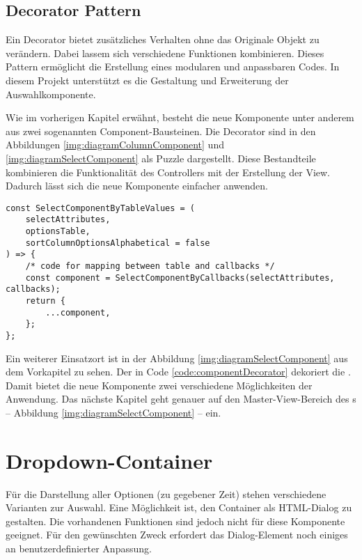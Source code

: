 \subsection{Decorator Pattern}
\label{sec:decoratorPattern}

Ein Decorator bietet zusätzliches Verhalten ohne das Originale Objekt zu verändern. 
Dabei lassem sich verschiedene Funktionen kombinieren. 
Dieses Pattern ermöglicht die Erstellung eines modularen und anpassbaren Codes. 
In diesem Projekt unterstützt es die Gestaltung und Erweiterung der Auswahlkomponente. 

Wie im vorherigen Kapitel erwähnt, besteht die neue Komponente unter anderem aus zwei sogenannten Component-Bausteinen. 
Die Decorator sind in den Abbildungen \ref{img:diagramColumnComponent} und \ref{img:diagramSelectComponent} als Puzzle dargestellt. 
Diese Bestandteile kombinieren die Funktionalität des Controllers mit der Erstellung der View. 
Dadurch lässt sich die neue Komponente einfacher anwenden. 

\begin{lstlisting}[style = htmlcssjs, caption = \codestyle{SelectComponentByTableValues} dekoriert \codestyle{SelectComponentByCallbacks}, label = code:componentDecorator]
const SelectComponentByTableValues = (
    selectAttributes,
    optionsTable,
    sortColumnOptionsAlphabetical = false
) => {
    /* code for mapping between table and callbacks */
    const component = SelectComponentByCallbacks(selectAttributes, callbacks);
    return {
        ...component,
    };
};
\end{lstlisting}

Ein weiterer Einsatzort ist in der Abbildung \ref{img:diagramSelectComponent} aus dem Vorkapitel zu sehen. 
Der  in Code \ref{code:componentDecorator} dekoriert die . 
Damit bietet die neue Komponente zwei verschiedene Möglichkeiten der Anwendung. 
Das nächste Kapitel geht genauer auf den Master-View-Bereich des s – Abbildung \ref{img:diagramSelectComponent} – ein. 


\section{Dropdown-Container}
\label{sec:dropdownContainer}

Für die Darstellung aller Optionen (zu gegebener Zeit) stehen verschiedene Varianten zur Auswahl. 
Eine Möglichkeit ist, den Container als HTML-Dialog zu gestalten. 
Die vorhandenen Funktionen sind jedoch nicht für diese Komponente geeignet. 
Für den gewünschten Zweck erfordert das Dialog-Element noch einiges an benutzerdefinierter Anpassung. 

